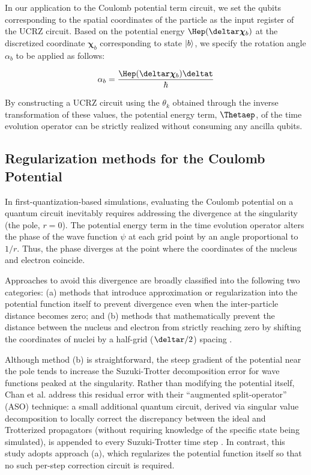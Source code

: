 \documentclass[manuscript_main.tex]{subfiles}
\begin{document}
In our application to the Coulomb potential term circuit, we set the qubits
corresponding to the spatial coordinates of the particle as the input register
of the UCRZ circuit. Based on the potential energy $\Hep(\deltar\bm{\chi}_b)$ at
the discretized coordinate $\bm{\chi}_b$ corresponding to state $\ket{b}$, we
specify the rotation angle $\alpha_b$ to be applied as follows:

\begin{equation}
\alpha_b = \frac{\Hep(\deltar\bm{\chi}_b)\deltat}{\hbar}
\end{equation}

By constructing a UCRZ circuit using the $\theta_k$ obtained through the inverse
transformation of these values, the potential energy term, $\Thetaep$, of the
time evolution operator can be strictly realized without consuming any ancilla
qubits.

\subsection{Regularization methods for the Coulomb Potential}
\label{subsec:coulomb-potential-handling}
In first-quantization-based simulations, evaluating the Coulomb potential on a
quantum circuit inevitably requires addressing the divergence at the singularity
(the pole, $r=0$). The potential energy term in the time evolution operator
alters the phase of the wave function $\psi$ at each grid point by an angle
proportional to $  1/r$. Thus, the phase diverges at the point where the
coordinates of the nucleus and electron coincide.

Approaches to avoid this divergence are broadly classified into the following
two categories: (a) methods that introduce approximation or regularization into
the potential function itself to prevent divergence even when the inter-particle
distance becomes zero; and (b) methods that mathematically prevent the distance
between the nucleus and electron from strictly reaching zero by shifting the
coordinates of nuclei by a half-grid ($\deltar/2$) spacing 
\cite{Chan2023.sciadv.abo7484}.

Although method (b) is straightforward, the steep gradient of the potential
near the pole tends to increase the Suzuki-Trotter decomposition error for
wave functions peaked at the singularity. Rather than modifying the
potential itself, Chan et al. address this residual error with their
``augmented split-operator'' (ASO) technique: a small additional quantum
circuit, derived via singular value decomposition to locally correct the
discrepancy between the ideal and Trotterized propagators (without
requiring knowledge of the specific state being simulated), is appended to
every Suzuki-Trotter time step \cite{Chan2023.sciadv.abo7484}. In contrast,
this study adopts approach (a), which regularizes the potential function
itself so that no such per-step correction circuit is required.
\end{document}

